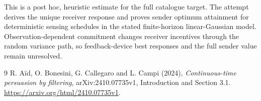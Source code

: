 \documentclass[11pt]{article}
\theoremstyle{definition}
\begin{document}
This is a post hoc, heuristic estimate for the full catalogue target.
The attempt derives the unique receiver response and proves sender optimum attainment for deterministic sensing schedules in the stated finite-horizon linear-Gaussian model. Observation-dependent commitment changes receiver incentives through the random variance path, so feedback-device best responses and the full sender value remain unresolved.

\begin{thebibliography}{9}
 R. A\"id, O. Bonesini, G. Callegaro and L. Campi (2024),
\emph{Continuous-time persuasion by filtering}, arXiv:2410.07735v1,
Introduction and Section 3.1. \url{https://arxiv.org/html/2410.07735v1}.
\end{thebibliography}
\end{document}
